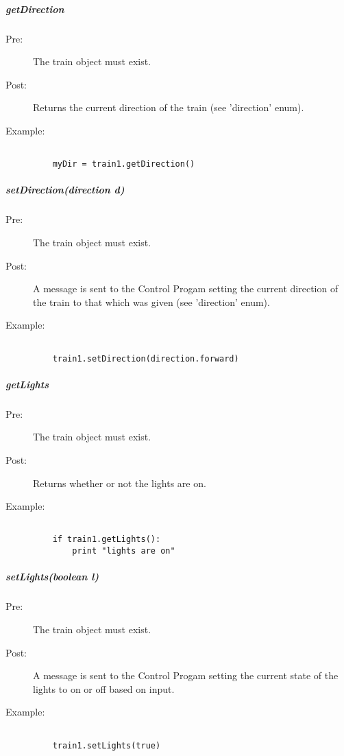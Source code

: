 \documentclass[a4paper,11pt,notitlepage]{article}
\def\CS{Control Progam\xspace}
\begin{document}
\subparagraph{getDirection}
\begin{description}
\item[\hspace{1cm}Pre:] The train object must exist.
\item[\hspace{1cm}Post:] Returns the current direction of the train (see 'direction' enum).
\item[\hspace{1cm}Example:]
\begin{verbatim}

	myDir = train1.getDirection()
\end{verbatim}
\end{description}

\subparagraph{setDirection(direction d)}
\begin{description}
\item[\hspace{1cm}Pre:] The train object must exist.
\item[\hspace{1cm}Post:] A message is sent to the \CS setting the current direction of the train to that which was given (see 'direction' enum).
\item[\hspace{1cm}Example:]
\begin{verbatim}

	train1.setDirection(direction.forward)
\end{verbatim}
\end{description}

\subparagraph{getLights}
\begin{description}
\item[\hspace{1cm}Pre:] The train object must exist.
\item[\hspace{1cm}Post:] Returns whether or not the lights are on.
\item[\hspace{1cm}Example:]
\begin{verbatim}

    if train1.getLights():
        print "lights are on"
\end{verbatim}
\end{description}

\subparagraph{setLights(boolean l)}
\begin{description}
\item[\hspace{1cm}Pre:] The train object must exist.
\item[\hspace{1cm}Post:] A message is sent to the \CS setting the current state of the lights to on or off based on input.
\item[\hspace{1cm}Example:]
\begin{verbatim}

    train1.setLights(true)
\end{verbatim}
\end{description}
\end{document}
